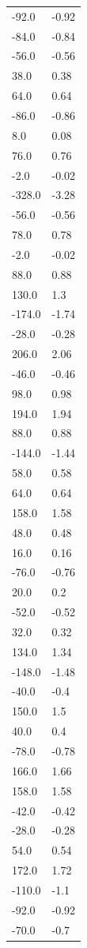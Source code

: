 \begin{longtable}{ll}
-92.0 & -0.92 \\
-84.0 & -0.84 \\
-56.0 & -0.56 \\
38.0 & 0.38 \\
64.0 & 0.64 \\
-86.0 & -0.86 \\
8.0 & 0.08 \\
76.0 & 0.76 \\
-2.0 & -0.02 \\
-328.0 & -3.28 \\
-56.0 & -0.56 \\
78.0 & 0.78 \\
-2.0 & -0.02 \\
88.0 & 0.88 \\
130.0 & 1.3 \\
-174.0 & -1.74 \\
-28.0 & -0.28 \\
206.0 & 2.06 \\
-46.0 & -0.46 \\
98.0 & 0.98 \\
194.0 & 1.94 \\
88.0 & 0.88 \\
-144.0 & -1.44 \\
58.0 & 0.58 \\
64.0 & 0.64 \\
158.0 & 1.58 \\
48.0 & 0.48 \\
16.0 & 0.16 \\
-76.0 & -0.76 \\
20.0 & 0.2 \\
-52.0 & -0.52 \\
32.0 & 0.32 \\
134.0 & 1.34 \\
-148.0 & -1.48 \\
-40.0 & -0.4 \\
150.0 & 1.5 \\
40.0 & 0.4 \\
-78.0 & -0.78 \\
166.0 & 1.66 \\
158.0 & 1.58 \\
-42.0 & -0.42 \\
-28.0 & -0.28 \\
54.0 & 0.54 \\
172.0 & 1.72 \\
-110.0 & -1.1 \\
-92.0 & -0.92 \\
-70.0 & -0.7 \\

\end{longtable}
